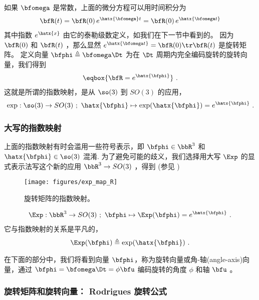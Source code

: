 如果 $\bfomega$ 是常数，上面的微分方程可以用时间积分为
%
\begin{align}
\bfR(t) = \bfR(0)\,e^{\hatx{\bfomega}t} = \bfR(0)\,e^{\hatx{\bfomega t}} 
\end{align}
%
其中指数 $e^{\hatx{x}}$ 由它的泰勒级数定义，如我们在下一节中看到的。
因为 $\bfR(0)$ 和 $\bfR(t)$ ，那么显然 $e^{\hatx{\bfomega t}}=\bfR(0)\tr\bfR(t)$ 是旋转矩阵。
定义向量 $\bfphi\triangleq\bfomega\Dt$ 为在 $\Dt$ 周期内完全编码旋转的旋转向量，我们得到
%
\begin{align}
\eqbox{
\bfR = e^{\hatx{\bfphi}} \label{equ:vectomat}
}~.
\end{align}
%
这就是所谓的指数映射，是从 $\so(3)$ 到 $SO(3)$ 的应用，
%
\begin{align}
\exp: \so(3) \to SO(3) ~;~ \hatx{\bfphi} \mapsto \exp(\hatx{\bfphi})=e^{\hatx{\bfphi}}
~.
\end{align}
%

\subsubsection{大写的指数映射}

上面的指数映射有时会滥用一些符号表示，即 $\bfphi\in\bbR^3$ 和 $\hatx{\bfphi}\in\so(3)$ 混淆.
%
为了避免可能的歧义，我们选择用大写 $\Exp$ 的显式表示法写这个新的应用 $\bbR^3\to SO(3)$ ，得到 (参见 )
%
\begin{figure}[tb]
\begin{center}
\texttt{[image: figures/exp\_map\_R]}
\caption{旋转矩阵的指数映射。}
\label{fig:exp_map_R}
\end{center}
\end{figure}
%
\begin{align}
\Exp: \bbR^3 \to SO(3) ~;~ \bfphi \mapsto \Exp(\bfphi) = e^{\hatx{\bfphi}}
~.
\end{align}
%
它与指数映射的关系是平凡的，
%
\begin{align}
\Exp(\bfphi) \triangleq \exp(\hatx{\bfphi})
~.
\end{align}


在下面的部分中，我们将看到向量 $\bfphi$，称为旋转向量或角-轴(angle-axis)向量，通过 $\bfphi=\bfomega\Dt=\phi\bfu$ 编码旋转的角度 $\phi$ 和轴 $\bfu$ 。


\subsubsection{旋转矩阵和旋转向量： Rodrigues 旋转公式}


